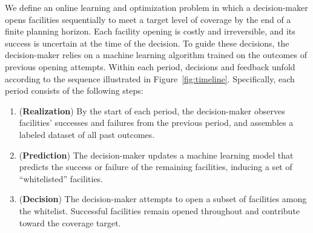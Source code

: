 \documentclass[blindrev]{informs3noheader}
\begin{document}
We define an online learning and optimization problem in which a decision-maker opens facilities sequentially to meet a target level of coverage by the end of a finite planning horizon. Each facility opening is costly and irreversible, and its success is uncertain at the time of the decision. To guide these decisions, the decision-maker relies on a machine learning algorithm trained on the outcomes of previous opening attempts. Within each period, decisions and feedback unfold according to the sequence illustrated in Figure~\ref{fig:timeline}. Specifically, each period consists of the following steps:
\begin{enumerate}
    \item (\textbf{Realization}) By the start of each period, the decision-maker observes facilities' successes and failures from the previous period, and assembles a labeled dataset of all past outcomes.
    \item (\textbf{Prediction}) The decision-maker updates a machine learning model that predicts the success or failure of the remaining facilities, inducing a set of ``whitelisted'' facilities.
    \item (\textbf{Decision}) The decision-maker attempts to open a subset of facilities among the whitelist. Successful facilities remain opened throughout and contribute toward the coverage target.
\end{enumerate}
\end{document}
